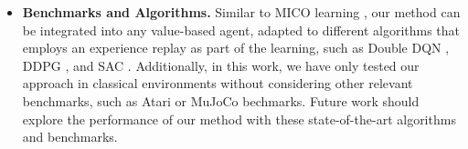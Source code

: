 \begin{itemize}
    \item \textbf{Benchmarks and Algorithms.} Similar to MICO learning \cite{castro2021mico},
    our method can be integrated into any value-based agent, adapted to different algorithms that  employs an experience replay as part of the learning, such as Double DQN \cite{van2016deep}, DDPG \cite{lillicrap2015continuous}, and SAC \cite{haarnoja2018soft}. Additionally, in this work, we have only tested our approach in classical environments without considering other relevant benchmarks, such as Atari \cite{bellemare2013arcade, machado2018revisiting} or MuJoCo \cite{todorov2012mujoco} bechmarks. Future work should explore the performance of our method with these state-of-the-art algorithms and benchmarks.
\end{itemize}






